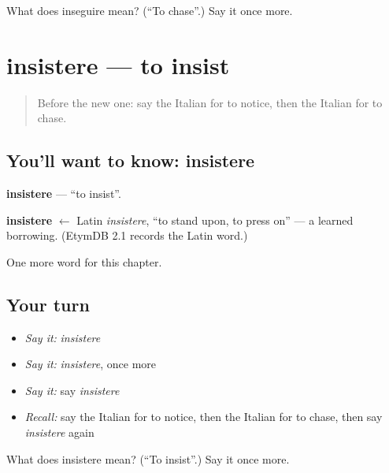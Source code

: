 \begin{tcolorbox}[breakable,colback=teal!4,colframe=teal!35!black,title={Before you move on}]
What does inseguire mean? (\textquotedblleft{}To chase\textquotedblright{}.) Say it once more.
\end{tcolorbox}
\section[insistere]{insistere — to insist}

\label{lesson:IT-C183-insistere}



\begin{quote}
Before the new one: say the Italian for to notice, then the Italian for to chase.
\end{quote}

\subsection*{You'll want to know: insistere}
\textbf{insistere} — \textquotedblleft{}to insist\textquotedblright{}.

\begin{cousinweb}
\textbf{insistere} $\leftarrow$ Latin \emph{insistere}, \textquotedblleft{}to stand upon, to press on\textquotedblright{} — a learned borrowing. (EtymDB 2.1 records the Latin word.)
\end{cousinweb}

\begin{grammarlens}[title={What you've built}]
One more word for this chapter.
\end{grammarlens}

\subsection*{Your turn}
\begin{itemize}
\raggedright
  \item \emph{Say it:} \emph{insistere}
  \item \emph{Say it:} \emph{insistere}, once more
  \item \emph{Say it:} say \emph{insistere}
  \item \emph{Recall:} say the Italian for to notice, then the Italian for to chase, then say \emph{insistere} again
\end{itemize}

\begin{tcolorbox}[breakable,colback=teal!4,colframe=teal!35!black,title={Before you move on}]
What does insistere mean? (\textquotedblleft{}To insist\textquotedblright{}.) Say it once more.
\end{tcolorbox}
